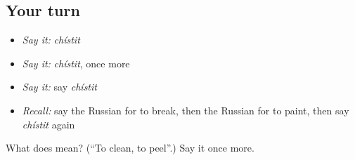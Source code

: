 \subsection*{Your turn}
\begin{itemize}
\raggedright
  \item \emph{Say it:} \emph{chístit}
  \item \emph{Say it:} \emph{chístit}, once more
  \item \emph{Say it:} say \emph{chístit}
  \item \emph{Recall:} say the Russian for to break, then the Russian for to paint, then say \emph{chístit} again
\end{itemize}

\begin{tcolorbox}[breakable,colback=teal!4,colframe=teal!35!black,title={Before you move on}]
What does  mean? (\textquotedblleft{}To clean, to peel\textquotedblright{}.) Say it once more.
\end{tcolorbox}
